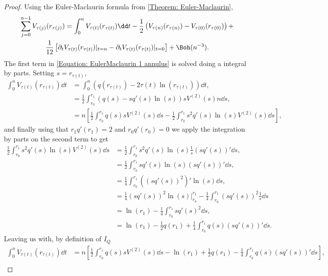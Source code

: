 \begin{proof}
	Using the Euler-Maclaurin formula from \autoref{Theorem: Euler-Maclaurin}, 
	\begin{multline}
		\sum_{j=0}^{n-1} V_{\tau(j)}(r_{\tau(j)}) = \int_0^n V_{\tau(t)}(r_{\tau(t)})  \dd t - \frac{1}{2} \left( V_{\tau(n)}(r_{\tau(n)})  - V_{\tau(0)}(r_{\tau(0)}) \right) + \\ \frac{1}{12} \left[ \partial_t V_{\tau(t)}(r_{\tau(t)}) |_{t=n} - \partial_t V_{\tau(t)}(r_{\tau(t)}) |_{t=0} \right] + \Boh(n^{-3}).
		\label{Equation: EulerMaclaurin 1 annulus}
	\end{multline}
	The first term in \eqref{Equation: EulerMaclaurin 1 annulus} is solved doing a integral by parts. Setting $s = r_{\tau(t)}$,
	\begin{align}
		\int_0^n V_{\tau(t)}(r_{\tau(t)})  \dd t & = \int_0^n (q(r_{\tau(t)}) - 2 \tau(t) \ln(r_{\tau(t)})) \dd t, \\
		& = \frac{1}{2} \int_{r_0}^{r_1} (q(s) - s q'(s) \ln(s)) s V^{(2)}(s) n \dd s, \\
		& = n \left[  \frac{1}{2} \int_{r_0}^{r_1} q(s) s V^{(2)}(s) \dd s -  \frac{1}{2} \int_{r_0}^{r_1} s^2 q'(s) \ln(s) V^{(2)}(s) \dd s \right],
	\end{align}
	and finally using that $r_1 q'(r_1) = 2$ and $r_0 q'(r_0) = 0$ we apply the integration by parts on the second term to get
	\begin{align}
		\frac{1}{2} \int_{r_0}^{r_1} s^2 q'(s) \ln(s) V^{(2)}(s) \dd s & = \frac{1}{2} \int_{r_0}^{r_1} s^2 q'(s) \ln(s) \frac{1}{s} (s q'(s))' \dd s, \\
		&= \frac{1}{2} \int_{r_0}^{r_1} s q'(s) \ln(s) (s q'(s))' \dd s, \\
		& = \frac{1}{4} \int_{r_0}^{r_1} ((sq'(s))^2)' \ln(s) \dd s, \\
		& = \frac{1}{4} (s q'(s))^2 \ln(s) \Big|_{r_0}^{r_1} - \frac{1}{4}  \int_{r_0}^{r_1} (s q'(s))^2 \frac{1}{s} \dd s \\
		& = \ln(r_1) - \frac{1}{4} \int_{r_0}^{r_1} s q'(s)^2 \dd s, \\
		& = \ln(r_1) - \frac{1}{2} q(r_1) + \frac{1}{4} \int_{r_0}^{r_1} q(s) (s q'(s))' \dd s.
	\end{align}
	Leaving us with, by definition of $I_Q$
	\begin{align}
		\int_0^n V_{\tau(t)}(r_{\tau(t)})  \dd t & = n \left[\frac{1}{2} \int_{r_0}^{r_1} q(s) s V^{(2)}(s) \dd s - \ln(r_1) + \frac{1}{2} q(r_1) - \frac{1}{4} \int_{r_0}^{r_1} q(s) (s q'(s))' \dd s \right],  \\

\end{align}
\end{proof}

